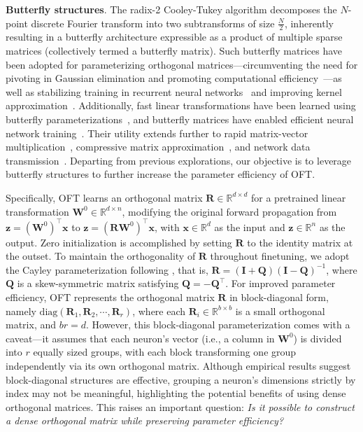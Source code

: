 \textbf{Butterfly structures}. The radix-2 Cooley-Tukey algorithm decomposes the $N$-point discrete Fourier transform into two subtransforms of size $\frac{N}{2}$, inherently resulting in a butterfly architecture expressible as a product of multiple sparse matrices (collectively termed a butterfly matrix). Such butterfly matrices have been adopted for parameterizing orthogonal matrices—circumventing the need for pivoting in Gaussian elimination and promoting computational efficiency~\cite{parker1995random}—as well as stabilizing training in recurrent neural networks~\cite{jing2017tunable} and improving kernel approximation~\cite{munkhoeva2018quadrature}. Additionally, fast linear transformations have been learned using butterfly parameterizations~\cite{dao2019learning,dao2019kaleidoscope}, and butterfly matrices have enabled efficient neural network training~\cite{chen2022pixelated,dao2022monarch}. Their utility extends further to rapid matrix-vector multiplication~\cite{michielssen1996multilevel,o2010algorithm}, compressive matrix approximation~\cite{li2015butterfly}, and network data transmission~\cite{klasing1994broadcasting,li2003linear,rajasingh2016transmission}. Departing from previous explorations, our objective is to leverage butterfly structures to further increase the parameter efficiency of OFT.

Specifically, OFT learns an orthogonal matrix $\bm{R}\in\mathbb{R}^{d\times d}$ for a pretrained linear transformation $\bm{W}^0\in\mathbb{R}^{d\times n}$, modifying the original forward propagation from $\bm{z}=(\bm{W}^0)^\top\bm{x}$ to $\bm{z}=(\bm{R}\bm{W}^0)^\top\bm{x}$, with $\bm{x}\in\mathbb{R}^{d}$ as the input and $\bm{z}\in\mathbb{R}^{n}$ as the output. Zero initialization is accomplished by setting $\bm{R}$ to the identity matrix at the outset. To maintain the orthogonality of $\bm{R}$ throughout finetuning, we adopt the Cayley parameterization following \cite{qiu2023controlling,liu2021orthogonal}, that is, $\bm{R}=(\bm{I}+\bm{Q})(\bm{I}-\bm{Q})^{-1}$, where $\bm{Q}$ is a skew-symmetric matrix satisfying $\bm{Q}=-\bm{Q}^\top$. For improved parameter efficiency, OFT represents the orthogonal matrix $\bm{R}$ in block-diagonal form, namely $\text{diag}(\bm{R}_1,\bm{R}_2,\cdots,\bm{R}_r)$, where each $\bm{R}_i\in\mathbb{R}^{b\times b}$ is a small orthogonal matrix, and $br=d$. However, this block-diagonal parameterization comes with a caveat—it assumes that each neuron's vector (i.e., a column in $\bm{W}^0$) is divided into $r$ equally sized groups, with each block transforming one group independently via its own orthogonal matrix. Although empirical results suggest block-diagonal structures are effective, grouping a neuron's dimensions strictly by index may not be meaningful, highlighting the potential benefits of using dense orthogonal matrices. This raises an important question: \emph{Is it possible to construct a dense orthogonal matrix while preserving parameter efficiency?}


